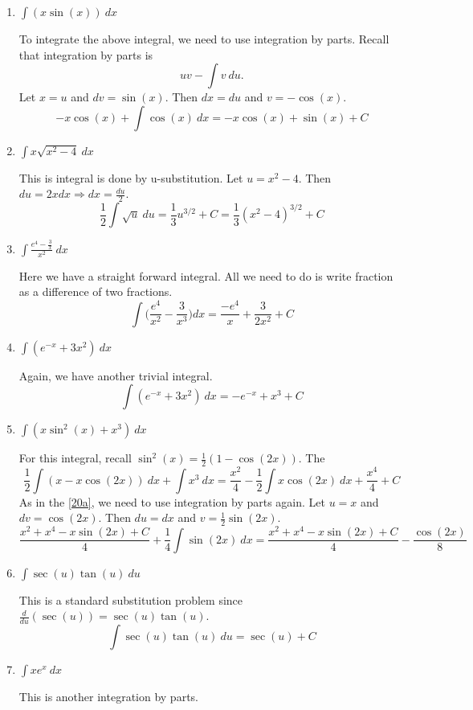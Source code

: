 \begin{enumerate}
\begin{enumerate}[label = (\alph*), ref = \theenumi{(\alph*)}]
  \item
    \label{20a}
    \(\int(x\sin(x)) \ dx\)
    \par\smallskip
    To integrate the above integral, we need to use integration by parts.
    Recall that integration by parts is
    \[
    uv - \int v \ du.
    \]
    Let \(x = u\) and \(dv = \sin(x)\).
    Then \(dx = du\) and \(v = -\cos(x)\).
    \[
    -x\cos(x) + \int\cos(x) \ dx = -x\cos(x) + \sin(x) + C
    \]
  \item
    \(\int x\sqrt{x^2 - 4} \ dx\)
    \par\smallskip
    This is integral is done by u-substitution.
    Let \(u = x^2 - 4\).
    Then \(du = 2xdx\Rightarrow dx = \frac{du}{2}\).
    \[
    \frac{1}{2}\int\sqrt{u} \ du = \frac{1}{3}u^{3/2} + C =
    \frac{1}{3}(x^2 - 4)^{3/2} + C
    \]
  \item
    \(\int\frac{e^4 - \frac{3}{x}}{x^2} \ dx\)
    \par\smallskip
    Here we have a straight forward integral.
    All we need to do is write fraction as a difference of two fractions.
    \[
    \int\bigg(\frac{e^4}{x^2} - \frac{3}{x^3}\bigg)dx =
    \frac{-e^4}{x} + \frac{3}{2x^2} + C
    \]
  \item
    \(\int(e^{-x} + 3x^2) \ dx\)
    \par\smallskip
    Again, we have another trivial integral.
    \[
    \int(e^{-x} + 3x^2) \ dx = -e^{-x} + x^3 + C
    \]
  \item
    \(\int(x\sin^2(x) + x^3) \ dx\)
    \par\smallskip
    For this integral, recall \(\sin^2(x) = \frac{1}{2}(1 - \cos(2x))\).
    The
    \[
    \frac{1}{2}\int(x - x\cos(2x)) \ dx + \int x^3 \ dx =
    \frac{x^2}{4} - \frac{1}{2}\int x\cos(2x) \ dx + \frac{x^4}{4} + C
    \]
    As in the \cref{20a}, we need to use integration by parts again.
    Let \(u = x\) and \(dv = \cos(2x)\).
    Then \(du = dx\) and \(v = \frac{1}{2}\sin(2x)\).
    \[
    \frac{x^2 + x^4 - x\sin(2x) + C}{4} + \frac{1}{4}\int\sin(2x) \ dx =
    \frac{x^2 + x^4 - x\sin(2x) + C}{4} - \frac{\cos(2x)}{8}
    \]
  \item
    \(\int\sec(u)\tan(u) \ du\)
    \par\smallskip
    This is a standard substitution problem since
    \(\frac{d}{du}(\sec(u)) = \sec(u)\tan(u)\).
    \[
    \int\sec(u)\tan(u) \ du = \sec(u) + C
    \]
  \item
    \(\int xe^x \ dx\)
    \par\smallskip
    This is another integration by parts.

\end{enumerate}
\end{enumerate}
